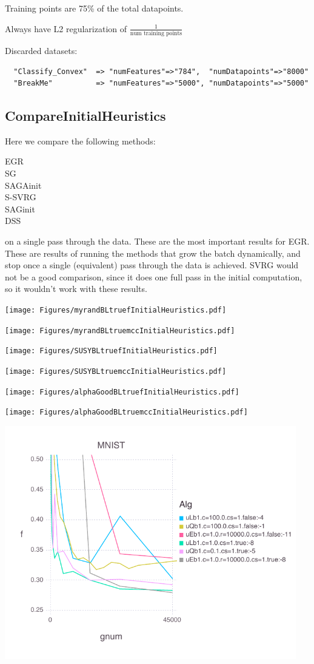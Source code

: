 \documentclass[11pt]{article}
\begin{document}
Training points are 75\% of the total datapoints. 

Always have L2 regularization of $\frac{1}{\mbox{num training points}}$

Discarded datasets:
\begin{verbatim}
  "Classify_Convex"  => "numFeatures"=>"784",  "numDatapoints"=>"8000"
  "BreakMe"          => "numFeatures"=>"5000", "numDatapoints"=>"5000"
\end{verbatim}


\subsection{CompareInitialHeuristics}

Here we compare the following methods:

EGR\\
SG\\
SAGAinit\\
S-SVRG\\
SAGinit\\
DSS

on a single pass through the data. These are the most important results for EGR. These are results of running the methods that grow the batch dynamically, and stop once a single (equivalent) pass through the data is achieved. SVRG would not be a good comparison, since it does one full pass in the initial computation, so it wouldn't work with these results.

\newpage 


\texttt{[image: Figures/myrandBLtruefInitialHeuristics.pdf]}

\texttt{[image: Figures/myrandBLtruemccInitialHeuristics.pdf]}

\texttt{[image: Figures/SUSYBLtruefInitialHeuristics.pdf]}

\texttt{[image: Figures/SUSYBLtruemccInitialHeuristics.pdf]}

\texttt{[image: Figures/alphaGoodBLtruefInitialHeuristics.pdf]}

\texttt{[image: Figures/alphaGoodBLtruemccInitialHeuristics.pdf]}

\includegraphics[width= 5in]{Figures/MNISTBLtruefInitialHeuristics.pdf}
\end{document}
